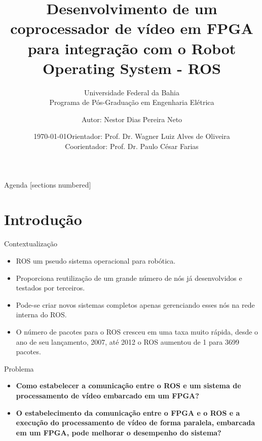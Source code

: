 \documentclass[10pt]{beamer}
\title{Desenvolvimento de um coprocessador de vídeo em FPGA para integração com o Robot Operating System - ROS}
\subtitle{Universidade Federal da Bahia\\
            Programa de Pós-Graduação em Engenharia Elétrica}
\date{\today}
\date{Orientador: Prof. Dr. Wagner Luiz Alves de Oliveira\\Coorientador: Prof. Dr. Paulo César Farias}
\author{Autor: Nestor Dias Pereira Neto}
\institute{Salvador, 5 de dezembro de 2022}
\begin{document}
\maketitle

\begin{frame}{Agenda}
  [sections numbered]
  \tableofcontents[hideallsubsections]
\end{frame}


\section{Introdução}

{
\begin{frame}[fragile]{Contextualização}
    \begin{itemize}
      \item ROS um pseudo sistema operacional para robótica.
      
      \item Proporciona reutilização de um grande número de nós já desenvolvidos e testados por terceiros.
      
      \item Pode-se criar novos sistemas completos apenas gerenciando esses nós na rede interna do ROS.
      
      \item O número de pacotes para o ROS cresceu em uma taxa muito rápida, desde o ano de seu lançamento, 2007, até 2012 o ROS aumentou de 1 para 3699 pacotes.
    \end{itemize}

 \nocite{LwIP,freertosbook,ROSeffect,PDSfpga,NiosIIbook,ROSfpga}
\end{frame}
}


{
\begin{frame}[fragile]{Problema}
	\begin{itemize}
		\item \textbf{Como estabelecer a comunicação entre o ROS e um sistema de processamento de vídeo embarcado em um FPGA? }
	\end{itemize}
	\begin{itemize}
		\item \textbf{O estabelecimento da comunicação entre o FPGA e o ROS e a execução do processamento de vídeo de forma paralela, embarcada em um FPGA, pode melhorar o desempenho do sistema?}
	\end{itemize}
\end{frame}
}
\end{document}
